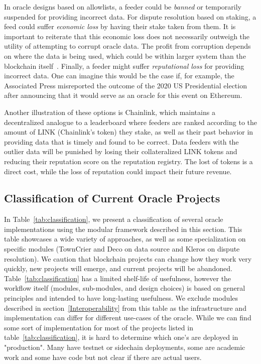 In oracle designs based on allowlists, a feeder could be \textit{banned} or temporarily suspended for providing incorrect data. For dispute resolution based on staking, a feed could suffer \textit{economic loss} by having their stake taken from them. It is important to reiterate that this economic loss does not necessarily outweigh the utility of attempting to corrupt oracle data. The profit from corruption depends on where the data is being used, which could be within larger system than the blockchain itself~\cite{FoBo19}. Finally, a feeder might suffer \textit{reputational loss} for providing incorrect data. One can imagine this would be the case if, for example, the Associated Press misreported the outcome of the 2020 US Presidential election after announcing that it would serve as an oracle for this event on Ethereum.

Another illustration of these options is Chainlink, which maintains a decentralized analogue to a leaderboard where feeders are ranked according to the amount of LINK (Chainlink's token) they stake, as well as their past behavior in providing data that is timely and found to be correct. Data feeders with the outlier data will be punished by losing their collateralized LINK tokens and reducing their reputation score on the reputation registry. The lost of tokens is a direct cost, while the loss of reputation could impact their future revenue. 




\subsection{Classification of Current Oracle Projects} \label{oracle_categories}



In Table~\ref{tab:classification}, we present a classification of several oracle implementations using the modular framework described in this section. This table showcases a wide variety of approaches, as well as some specialization on specific modules (\eg TownCrier and Deco on data source and Kleros on dispute resolution). We caution that blockchain projects can change how they work very quickly, new projects will emerge, and current projects will be abandoned. Table~\ref{tab:classification} has a limited shelf-life of usefulness, however the workflow itself (modules, sub-modules, and design choices) is based on general principles and intended to have long-lasting usefulness. We exclude modules described in section~\ref{Interoperability} from this table as the infrastructure and implementation can differ for different use-cases of the oracle.
While we can find some sort of implementation for most of the projects listed in table~\ref{tab:classification}, it is hard to determine which one's are deployed in "production". Many have testnet or sidechain deployments, some are academic work and some have code but not clear if there are actual users.


